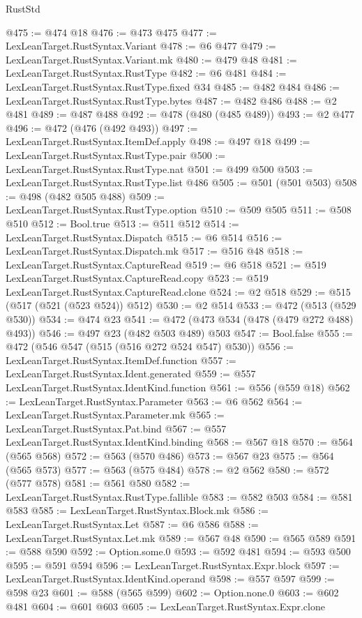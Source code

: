 \begin{lexlean}{RustStd}
\begin{coremodule}
@475 := @474 @18
@476 := @473 @475
@477 := LexLeanTarget.RustSyntax.Variant
@478 := @6 @477
@479 := LexLeanTarget.RustSyntax.Variant.mk
@480 := @479 @48
@481 := LexLeanTarget.RustSyntax.RustType
@482 := @6 @481
@484 := LexLeanTarget.RustSyntax.RustType.fixed @34
@485 := @482 @484
@486 := LexLeanTarget.RustSyntax.RustType.bytes
@487 := @482 @486
@488 := @2 @481
@489 := @487 @488
@492 := @478 (@480 (@485 @489))
@493 := @2 @477
@496 := @472 (@476 (@492 @493))
@497 := LexLeanTarget.RustSyntax.ItemDef.apply
@498 := @497 @18
@499 := LexLeanTarget.RustSyntax.RustType.pair
@500 := LexLeanTarget.RustSyntax.RustType.nat
@501 := @499 @500
@503 := LexLeanTarget.RustSyntax.RustType.list @486
@505 := @501 (@501 @503)
@508 := @498 (@482 @505 @488)
@509 := LexLeanTarget.RustSyntax.RustType.option
@510 := @509 @505
@511 := @508 @510
@512 := Bool.true
@513 := @511 @512
@514 := LexLeanTarget.RustSyntax.Dispatch
@515 := @6 @514
@516 := LexLeanTarget.RustSyntax.Dispatch.mk
@517 := @516 @48
@518 := LexLeanTarget.RustSyntax.CaptureRead
@519 := @6 @518
@521 := @519 LexLeanTarget.RustSyntax.CaptureRead.copy
@523 := @519 LexLeanTarget.RustSyntax.CaptureRead.clone
@524 := @2 @518
@529 := @515 (@517 (@521 (@523 @524)) @512)
@530 := @2 @514
@533 := @472 (@513 (@529 @530))
@534 := @474 @23
@541 := @472 (@473 @534 (@478 (@479 @272 @488) @493))
@546 := @497 @23 (@482 @503 @489) @503
@547 := Bool.false
@555 := @472 (@546 @547 (@515 (@516 @272 @524 @547) @530))
@556 := LexLeanTarget.RustSyntax.ItemDef.function
@557 := LexLeanTarget.RustSyntax.Ident.generated
@559 := @557 LexLeanTarget.RustSyntax.IdentKind.function
@561 := @556 (@559 @18)
@562 := LexLeanTarget.RustSyntax.Parameter
@563 := @6 @562
@564 := LexLeanTarget.RustSyntax.Parameter.mk
@565 := LexLeanTarget.RustSyntax.Pat.bind
@567 := @557 LexLeanTarget.RustSyntax.IdentKind.binding
@568 := @567 @18
@570 := @564 (@565 @568)
@572 := @563 (@570 @486)
@573 := @567 @23
@575 := @564 (@565 @573)
@577 := @563 (@575 @484)
@578 := @2 @562
@580 := @572 (@577 @578)
@581 := @561 @580
@582 := LexLeanTarget.RustSyntax.RustType.fallible
@583 := @582 @503
@584 := @581 @583
@585 := LexLeanTarget.RustSyntax.Block.mk
@586 := LexLeanTarget.RustSyntax.Let
@587 := @6 @586
@588 := LexLeanTarget.RustSyntax.Let.mk
@589 := @567 @48
@590 := @565 @589
@591 := @588 @590
@592 := Option.some.{0}
@593 := @592 @481
@594 := @593 @500
@595 := @591 @594
@596 := LexLeanTarget.RustSyntax.Expr.block
@597 := LexLeanTarget.RustSyntax.IdentKind.operand
@598 := @557 @597
@599 := @598 @23
@601 := @588 (@565 @599)
@602 := Option.none.{0}
@603 := @602 @481
@604 := @601 @603
@605 := LexLeanTarget.RustSyntax.Expr.clone

\end{coremodule}
\end{lexlean}
